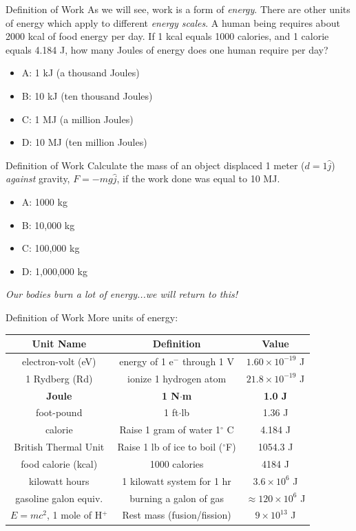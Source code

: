 \documentclass{beamer}
\begin{document}
\begin{frame}{Definition of Work}
As we will see, work is a form of \textit{energy}.  There are other units of energy which apply to different \textit{energy scales}.  A human being requires about 2000 kcal of food energy per day.  If 1 kcal equals 1000 calories, and 1 calorie equals 4.184 J, how many Joules of energy does one human require per day?
\begin{itemize}
\item A: 1 kJ (a thousand Joules)
\item B: 10 kJ (ten thousand Joules)
\item C: 1 MJ (a million Joules)
\item D: 10 MJ (ten million Joules) 
\end{itemize}
\end{frame}

\begin{frame}{Definition of Work}
Calculate the mass of an object displaced 1 meter ($d = 1\hat{j}$) \textit{against} gravity, $F = -mg\hat{j}$, if the work done was equal to 10 MJ.
\begin{itemize}
\item A: 1000 kg
\item B: 10,000 kg
\item C: 100,000 kg
\item D: 1,000,000 kg
\end{itemize}
\textit{Our bodies burn a lot of energy...we will return to this!}
\end{frame}

\begin{frame}{Definition of Work}
\small
More units of energy:
\begin{table}
\centering
\begin{tabular}{c | c | c}
\alert{Unit Name} & \alert{Definition} & \alert{Value} \\ \hline
electron-volt (eV) & energy of 1 e$^{-}$ through 1 V & $1.60\times 10^{-19}$ J \\ \hline
1 Rydberg (Rd) & ionize 1 hydrogen atom & $21.8\times 10^{-19}$ J \\ \hline
\textbf{Joule} & \textbf{1 N$\cdot$m} & \textbf{1.0 J} \\ \hline
foot-pound & 1 ft$\cdot$lb & 1.36 J \\ \hline
calorie & Raise 1 gram of water 1$^{\circ}$ C & 4.184 J \\ \hline
British Thermal Unit & Raise 1 lb of ice to boil ($^{\circ}$F) & 1054.3 J \\ \hline
food calorie (kcal) & 1000 calories & 4184 J \\ \hline
kilowatt hours & 1 kilowatt system for 1 hr & $3.6\times 10^6$ J \\ \hline
gasoline galon equiv. & burning a galon of gas & $\approx 120 \times 10^6$ J \\ \hline
$E = mc^2$, 1 mole of H$^{+}$ & Rest mass (fusion/fission) & $9 \times 10^{13}$ J \\ \hline
\end{tabular}
\end{table}
\end{frame}
\end{document}

